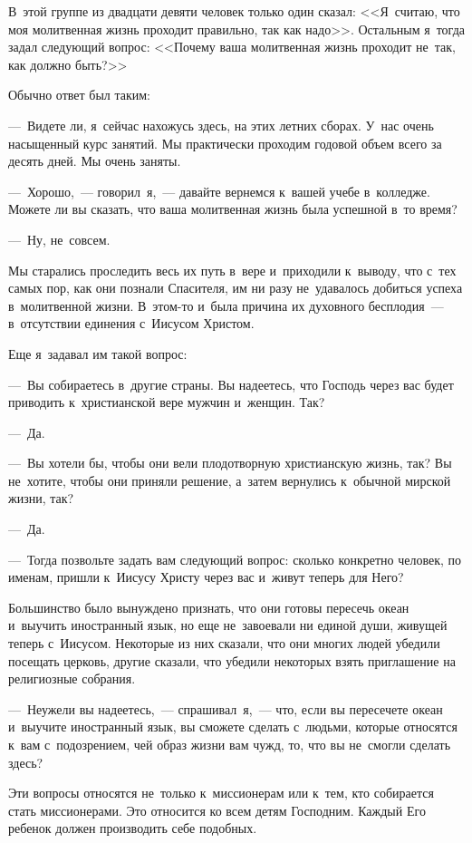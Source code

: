 \documentclass[12pt,article,a4paper,fittopage]{ncc}
\begin{document}
\begin{multicols}{2}
В~этой группе из двадцати девяти человек только один сказал: <<Я~считаю, что моя молитвенная жизнь проходит правильно, так как надо>>. Остальным я~тогда задал следующий вопрос: <<Почему ваша молитвенная жизнь проходит не~так, как должно быть?>>

Обычно ответ был таким: 

---~Видете ли, я~сейчас нахожусь здесь, на этих летних сборах. У~нас очень насыщенный курс занятий. Мы практически проходим годовой объем всего за десять дней. Мы очень заняты.

---~Хорошо,~--- говорил~я,~--- давайте вернемся к~вашей учебе в~колледже. Можете ли вы сказать, что ваша молитвенная жизнь была успешной в~то время?

---~Ну, не~совсем.

Мы старались проследить весь их путь в~вере и~приходили к~выводу, что с~тех самых пор, как они познали Спасителя, им ни разу не~удавалось добиться успеха в~молитвенной жизни. В~этом-то и~была причина их духовного бесплодия~--- в~отсутствии единения с~Иисусом Христом.

Еще я~задавал им такой вопрос:

---~Вы собираетесь в~другие страны. Вы надеетесь, что Господь через вас будет приводить к~христианской вере мужчин и~женщин. Так?

---~Да.

---~Вы хотели бы, чтобы они вели плодотворную христианскую жизнь, так? Вы не~хотите, чтобы они приняли решение, а~затем вернулись к~обычной мирской жизни, так?

---~Да.

---~Тогда позвольте задать вам следующий вопрос: сколько конкретно человек, по именам, пришли к~Иисусу Христу через вас и~живут теперь для Него?

Большинство было вынуждено признать, что они готовы пересечь океан и~выучить иностранный язык, но еще не~завоевали ни единой души, живущей теперь с~Иисусом. Некоторые из них сказали, что они многих людей убедили посещать церковь, другие сказали, что убедили некоторых взять приглашение на религиозные собрания.

---~Неужели вы надеетесь,~--- спрашивал~я,~--- что, если вы пересечете океан и~выучите иностранный язык, вы сможете сделать с~людьми, которые относятся к~вам с~подозрением, чей образ жизни вам чужд, то, что вы не~смогли сделать здесь?

Эти вопросы относятся не~только к~миссионерам или к~тем, кто собирается стать миссионерами. Это относится ко всем детям Господним. Каждый Его ребенок должен производить себе подобных.


\end{multicols}
\end{document}

